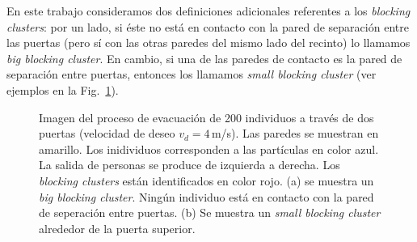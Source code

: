En este trabajo consideramos dos definiciones adicionales referentes a los \textit{blocking clusters}: por un lado, si éste no está en contacto con la pared de separación entre las puertas (pero sí con las otras paredes del mismo lado del recinto) lo llamamos \textit{big blocking cluster}. En cambio, si una de las paredes de contacto es la pared de separación entre puertas, entonces los llamamos \textit{small blocking cluster} (ver ejemplos en la Fig.~\ref{bc}).

\begin{figure}[H]
    \centering
    \hfill
    \caption[width=5cm]{Imagen del proceso de evacuación de  200 individuos a través de dos puertas (velocidad de deseo $v_d=4\,$m/s). Las paredes se muestran en amarillo. Los inidividuos corresponden a las partículas en color azul. La salida de personas se produce de izquierda a derecha. Los \textit{blocking clusters} están identificados en color rojo. (a) se muestra un \textit{big blocking cluster}. Ningún individuo está en contacto con la pared de seperación entre puertas. (b)  Se muestra un \textit{small blocking cluster} alrededor de la puerta superior.}
    \label{bc}
\end{figure}


